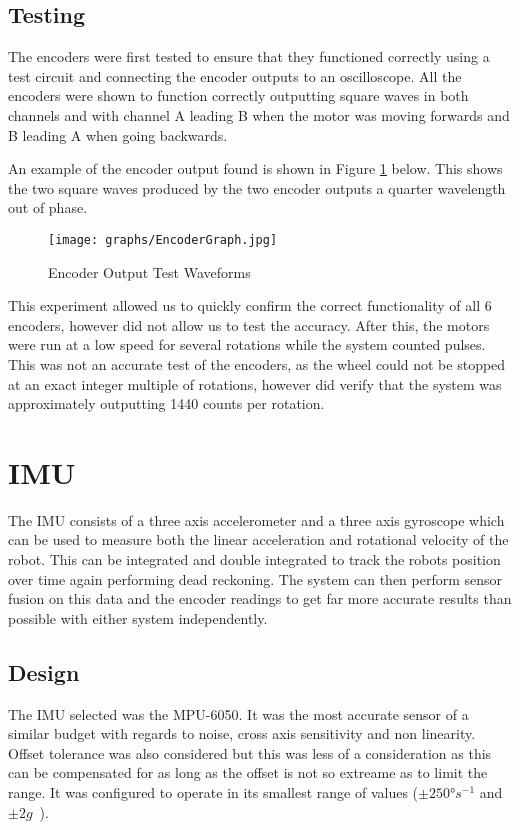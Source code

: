 \subsection{Testing}\label{elec/encoder/test}
The encoders were first tested to ensure that they functioned correctly
using a test circuit and connecting the encoder outputs to an
oscilloscope. All the encoders were shown to function correctly
outputting square waves in both channels and with channel A leading B
when the motor was moving forwards and B leading A when going backwards.

An example of the encoder output found is shown in Figure
\ref{EncoderGraph} below. This shows the two square waves produced by the
two encoder outputs a quarter wavelength out of phase.

\begin{figure}[!ht]
	\centering
	\texttt{[image: graphs/EncoderGraph.jpg]}
	\caption{Encoder Output Test Waveforms}\label{EncoderGraph}

\end{figure}

This experiment allowed us to quickly confirm the correct functionality
of all 6 encoders, however did not allow us to test the accuracy. After
this, the motors were run at a low speed for several rotations while the
system counted pulses. This was not an accurate test of the encoders, as
the wheel could not be stopped at an exact integer multiple of rotations,
however did verify that the system was approximately outputting 1440
counts per rotation.

\section{IMU}\label{elec/imu}
The IMU consists of a three axis accelerometer and a three axis gyroscope
which can be used to measure both the linear acceleration and rotational
velocity of the robot. This can be integrated and double integrated to
track the robots position over time again performing dead reckoning. The
system can then perform sensor fusion on this data and the encoder
readings to get far more accurate results than possible with either system
independently.

\subsection{Design}\label{elec/imu/design}
The IMU selected was the MPU-6050. It was the most accurate sensor of a
similar budget with regards to noise, cross axis sensitivity and non
linearity. Offset tolerance was also considered but this was less of a
consideration as this can be compensated for as long as the offset is not
so extreame as to limit the range. It was configured to operate in its
smallest range of values ($\pm\ang{250}s^{-1}$ and $\pm2g$~\cite{MPU6050Datasheet}).

